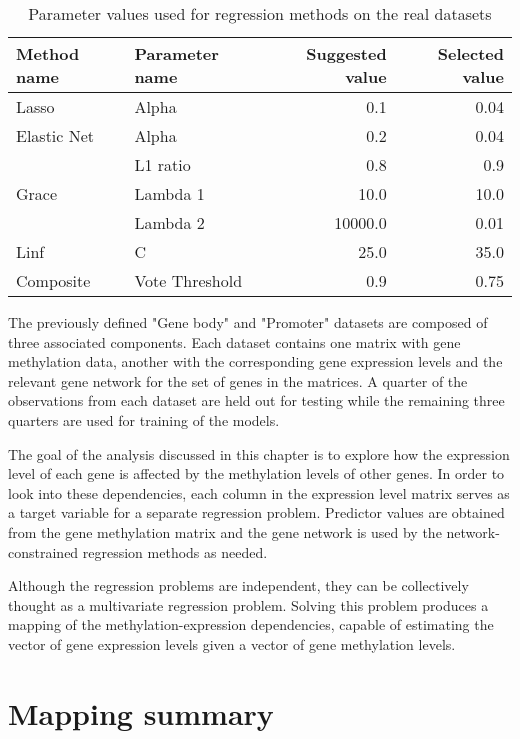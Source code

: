 {\def\arraystretch{1.5}\tabcolsep=10pt
	\begin{table}[H]
		\label{tab:plswork}
		\caption{Parameter values used for regression methods on the real datasets}
		\centering
		\begin{tabular}{l l r r}
			\hline\hline 
			Method name & Parameter name & Suggested value & Selected value\\
			\hline\hline
			Lasso	&	Alpha	&	0.1	&	0.04\\
			\hline
			Elastic Net	&	Alpha	&	0.2	&	0.04\\
						&	L1 ratio&	0.8	&	0.9\\
			\hline
			Grace	&	Lambda 1	&	10.0	&	10.0\\
					&	Lambda 2	&	10000.0	&	0.01\\
			\hline
			Linf	&	C	&	25.0	&	35.0\\
			\hline
			Composite	&	Vote Threshold	&	0.9	&	0.75\\
			\hline
		\end{tabular}
	\end{table}
}

The previously defined "Gene body" and "Promoter" datasets are composed of three associated components. Each dataset contains one matrix with gene methylation data, another with the corresponding gene expression levels and the relevant gene network for the set of genes in the matrices. A quarter of the observations from each dataset are held out for testing while the remaining three quarters are used for training of the models.

The goal of the analysis discussed in this chapter is to explore how the expression level of each gene is affected by the methylation levels of other genes. In order to look into these dependencies, each column in the expression level matrix serves as a target variable for a separate regression problem. Predictor values are obtained from the gene methylation matrix and the gene network is used by the network-constrained regression methods as needed. 

Although the regression problems are independent, they can be collectively thought as a multivariate regression problem. Solving this problem produces a mapping of the methylation-expression dependencies, capable of estimating the vector of gene expression levels given a vector of gene methylation levels.


\section{Mapping summary}


